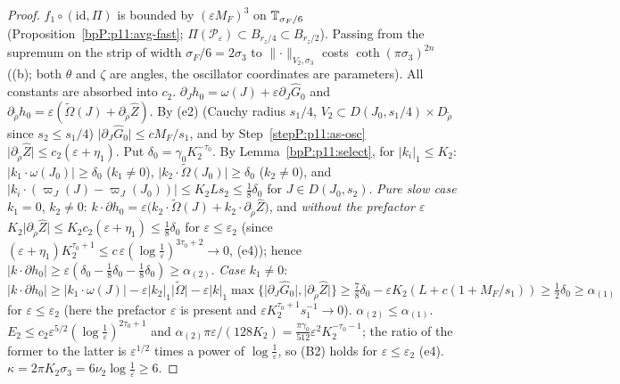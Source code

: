 \begin{proof}
$f_1\circ(\mathrm{id},\Pi)$ is bounded by $(\varepsilon M_F)^3$ on $\mathbb{T}_{\sigma_F/6}$ (Proposition~\ref{bpP:p11:avg-fast}; $\Pi(\mathcal P_\varepsilon)\subset B_{r_z/4}\subset B_{r_z/2}$). Passing from the supremum on the strip of width $\sigma_F/6=2\sigma_3$ to $\lVert\cdot\rVert_{V_2,\sigma_3}$ costs $\coth(\pi\sigma_3)^{2n}$ ((b); both $\theta$ and $\zeta$ are angles, the oscillator coordinates are parameters). All constants are absorbed into $c_2$.
\label{stepP:p11:as-nr} $\partial_Jh_0=\omega(J)+\varepsilon\partial_J\hat G_0$ and $\partial_{\tilde\rho}h_0=\varepsilon(\tilde\Omega(J)+\partial_{\tilde\rho}\hat Z)$. By (e2) (Cauchy radius $s_1/4$, $V_2\subset D(J_0,s_1/4)\times D_{\tilde\rho}$ since $s_2\le s_1/4$) $\lvert\partial_J\hat G_0\rvert\le cM_F/s_1$, and by Step~\ref{stepP:p11:as-osc} $\lvert\partial_{\tilde\rho}\hat Z\rvert\le c_2(\varepsilon+\eta_1)$. Put $\delta_0=\gamma_0K_2^{-\tau_0}$. By Lemma~\ref{bpP:p11:select}, for $\lvert k_i\rvert_1\le K_2$: $\lvert k_1\cdot\omega(J_0)\rvert\ge\delta_0$ ($k_1\ne0$), $\lvert k_2\cdot\tilde\Omega(J_0)\rvert\ge\delta_0$ ($k_2\ne0$), and $\lvert k_i\cdot(\varpi_J(J)-\varpi_J(J_0))\rvert\le K_2Ls_2\le\frac18\delta_0$ for $J\in D(J_0,s_2)$. \emph{Pure slow case} $k_1=0$, $k_2\ne0$: $k\cdot\partial h_0=\varepsilon\bigl(k_2\cdot\tilde\Omega(J)+k_2\cdot\partial_{\tilde\rho}\hat Z\bigr)$, and \emph{without the prefactor $\varepsilon$} $K_2\lvert\partial_{\tilde\rho}\hat Z\rvert\le K_2c_2(\varepsilon+\eta_1)\le\frac18\delta_0$ for $\varepsilon\le\varepsilon_2$ (since $(\varepsilon+\eta_1)K_2^{\tau_0+1}\le c\,\varepsilon(\log\frac1\varepsilon)^{3\tau_0+2}\to0$, (e4)); hence $\lvert k\cdot\partial h_0\rvert\ge\varepsilon(\delta_0-\frac18\delta_0-\frac18\delta_0)\ge\alpha_{(2)}$. \emph{Case $k_1\ne0$}: $\lvert k\cdot\partial h_0\rvert\ge\lvert k_1\cdot\omega(J)\rvert-\varepsilon\lvert k_2\rvert_1\lvert\tilde\Omega\rvert-\varepsilon\lvert k\rvert_1\max\{\lvert\partial_J\hat G_0\rvert,\lvert\partial_{\tilde\rho}\hat Z\rvert\}\ge\frac78\delta_0-\varepsilon K_2(L+c(1+M_F/s_1))\ge\frac12\delta_0\ge\alpha_{(1)}$ for $\varepsilon\le\varepsilon_2$ (here the prefactor $\varepsilon$ is present and $\varepsilon K_2^{\tau_0+1}s_1^{-1}\to0$). $\alpha_{(2)}\le\alpha_{(1)}$.
\label{stepP:p11:as-b2} $E_2\le c_2\varepsilon^{5/2}(\log\frac1\varepsilon)^{2\tau_0+1}$ and $\alpha_{(2)}\pi\varepsilon/(128K_2)=\frac{\pi\gamma_0}{512}\varepsilon^2K_2^{-\tau_0-1}$; the ratio of the former to the latter is $\varepsilon^{1/2}$ times a power of $\log\frac1\varepsilon$, so (B2) holds for $\varepsilon\le\varepsilon_2$ (e4). $\kappa=2\pi K_2\sigma_3=6\nu_2\log\frac1\varepsilon\ge6$.

\end{proof}
